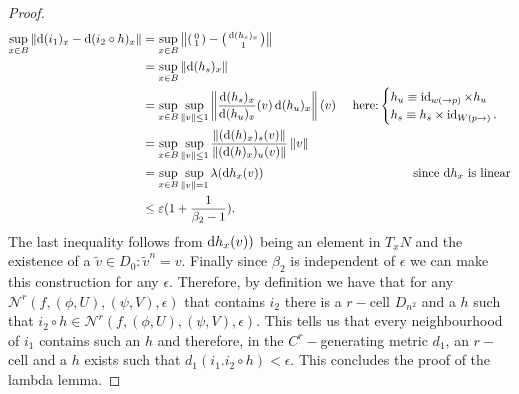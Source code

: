 \begin{proof}
\begin{align*}
\sup_{x\in B} \norm{ \diff( i_{1} )_x-\diff (i_2 \circ h )_x} &= \sup_{x\in B} \norm{ \begin{psmallmatrix}
0 \\
 1
\end{psmallmatrix}- \begin{psmallmatrix}
\diff (h_s)_x \\
1
\end{psmallmatrix} } \\
&=\sup _{x\in B} \norm{\diff (h_s)_x } &\\
&= \sup_{x \in B} \sup_{\norm{v}\leq 1} \norm{\frac{\diff(h_s)_x}{\diff(h_u)_x}(v) \diff(h_u)_x}(v) & \text{ here:} \begin{cases} h_u \equiv  \id_{w(\to p)} \times h_u \\
h_s \equiv h_s \times \id_{W(p \to)}.
\end{cases} \\
&=\sup_{x \in B} \sup_{\norm{v}\leq 1} \frac{\norm{(\diff(h)_x)_s(v)}}{\norm{(\diff(h)_x)_u(v)}}\norm{v}\\
&= \sup_{x \in B} \sup_{\norm{v} = 1} \lambda(\diff h_x(v)) & \text{since $\diff h_x$ is linear} \\
& \leq \epsilon(1+\frac{1}{\beta_2-1}).
\end{align*} The last inequality follows from $\mathop{}\!\mathrm{d} h_x(v))$ being an element in $T_xN$ and the existence of a $\tilde{v} \in D_0:\tilde{v}^n=v$. Finally since $\beta_2$ is independent of $\epsilon$ we can make this construction for any $\epsilon$. Therefore, by definition we have that for any $\mathcal{N}^r(f,(\phi,U),(\psi,V),\epsilon)$ that contains $i_2$ there is a $r-$cell $D_{n^2}$ and a $h$ such that $i_2 \circ h \in \mathcal{N}^r(f,(\phi,U),(\psi,V),\epsilon)$. This tells us that every neighbourhood of $i_1$ contains such an $h$ and therefore, in the $C^r-$generating metric $d_1$, an $r-$cell and a $h$ exists such that $d_1(i_1.i_2\circ h)<\epsilon.$ This concludes the proof of the lambda lemma.  
\end{proof} 










